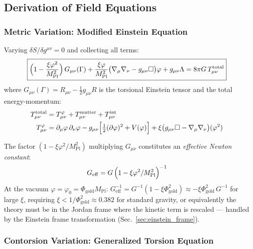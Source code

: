 \documentclass[12pt,a4paper]{article}
\newcommand{\MPl}{M_{\mathrm{Pl}}}
\numberwithin{equation}{section}
\begin{document}
\subsection{Derivation of Field Equations}

\subsubsection{Metric Variation: Modified Einstein Equation}

Varying $\delta S/\delta g^{\mu\nu} = 0$ and collecting all terms:
\begin{equation}
  \boxed{
  \Bigl(1 - \frac{\xi\varphi^2}{\MPl^2}\Bigr)\,G_{\mu\nu}(\Gamma)
  + \frac{\xi\varphi}{\MPl^2}\bigl(\nabla_\mu\nabla_\nu - g_{\mu\nu}\Box\bigr)\varphi
  + g_{\mu\nu}\Lambda
  = 8\pi G\,T_{\mu\nu}^{\mathrm{total}}
  }
  \label{eq:einstein_TTH}
\end{equation}
where $G_{\mu\nu}(\Gamma)=R_{\mu\nu}-\tfrac{1}{2}g_{\mu\nu}R$ is the torsional Einstein tensor
and the total energy-momentum:
\begin{align}
  T_{\mu\nu}^{\mathrm{total}} &= T_{\mu\nu}^\varphi + T_{\mu\nu}^{\mathrm{matter}}
  + T_{\mu\nu}^{\mathrm{int}} \label{eq:total_EM}\\
  T_{\mu\nu}^\varphi &= \partial_\mu\varphi\,\partial_\nu\varphi
  - g_{\mu\nu}\Bigl[\tfrac{1}{2}(\partial\varphi)^2 + V(\varphi)\Bigr]
  + \xi\bigl(g_{\mu\nu}\Box - \nabla_\mu\nabla_\nu\bigr)(\varphi^2)
  \label{eq:phi_EM}
\end{align}

The factor $(1 - \xi\varphi^2/\MPl^2)$ multiplying $G_{\mu\nu}$ constitutes an
\emph{effective Newton constant}:
\begin{equation}
  G_{\mathrm{eff}} = G\,\Bigl(1 - \xi\varphi^2/\MPl^2\Bigr)^{-1}
  \label{eq:G_eff}
\end{equation}
At the vacuum $\varphi = \varphi_0 = \Phi_{\mathrm{gold}}\MPl$:
$G_{\mathrm{eff}}^{-1} = G^{-1}(1 - \xi\Phi_{\mathrm{gold}}^2) \approx -\xi\Phi_{\mathrm{gold}}^2\,G^{-1}$
for large $\xi$, requiring $\xi < 1/\Phi_{\mathrm{gold}}^2 \approx 0.382$ for standard gravity,
or equivalently the theory must be in the Jordan frame where the kinetic
term is rescaled --- handled by the Einstein frame transformation (Sec.~\ref{sec:einstein_frame}).

\subsubsection{Contorsion Variation: Generalized Torsion Equation}
\end{document}

